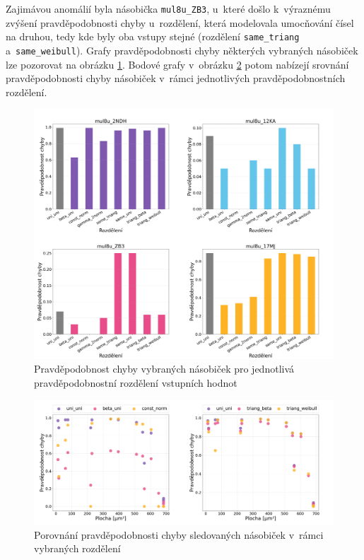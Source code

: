 Zajimávou anomálií byla násobička \texttt{mul8u\_ZB3}, u~které došlo k~výraznému zvýšení pravděpodobnosti chyby u~rozdělení, která modelovala umocňování čísel na druhou, tedy kde byly oba vstupy stejné (rozdělení \texttt{same\_triang} a~\texttt{same\_weibull}). Grafy pravděpodobnosti chyby některých vybraných násobiček lze pozorovat na obrázku \ref{fig:metrics_error_prob}. Bodové grafy v~obrázku \ref{fig:scatter_error_prob} potom nabízejí srovnání pravděpodobnosti chyby násobiček v~rámci jednotlivých pravděpodobnostních rozdělení.

\begin{figure}[H]
    \centering
    \includegraphics[width=\textwidth]{obrazky-figures/metrics_error_prob.png}
    \caption{Pravděpodobnost chyby vybraných násobiček pro jednotlivá pravděpodobnostní rozdělení vstupních hodnot}
    \label{fig:metrics_error_prob}
\end{figure}

\begin{figure}[H]
    \centering
    \includegraphics[width=\textwidth]{obrazky-figures/scatter_error_prob.png}
    \caption{Porovnání pravděpodobnosti chyby sledovaných násobiček v~rámci vybraných rozdělení}
    \label{fig:scatter_error_prob}
\end{figure}

